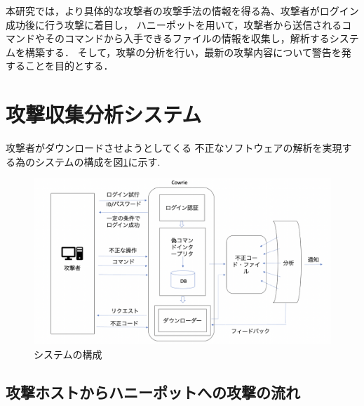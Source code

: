 \documentclass{entry}
\begin{document}
本研究では，より具体的な攻撃者の攻撃手法の情報を得る為、攻撃者がログイン成功後に行う攻撃に着目し，
ハニーポットを用いて，攻撃者から送信されるコマンドやそのコマンドから入手できるファイルの情報を収集し，解析するシステムを構築する．
そして，攻撃の分析を行い，最新の攻撃内容について警告を発することを目的とする．

\section{攻撃収集分析システム}


攻撃者がダウンロードさせようとしてくる
不正なソフトウェアの解析を実現する為のシステムの構成を図\ref{fig:system}に示す.

\begin{figure}[htbp]
	\centering
 	\includegraphics[width=\linewidth]{hpsystem.png}
 	\caption{システムの構成}\label{fig:system}
\end{figure}



\subsection{攻撃ホストからハニーポットへの攻撃の流れ}



\end{document}
